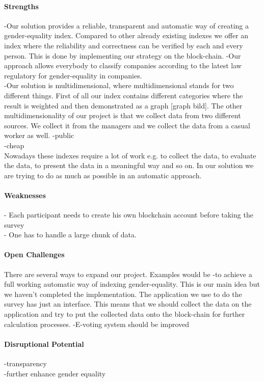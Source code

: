 \paragraph*{Strengths}
-Our solution provides a reliable, transparent and automatic way of creating a gender-equality index. Compared to other already existing indexes we offer an index where the reliability and correctness can be verified by each and every person. This is done by implementing our strategy on the block-chain. 
-Our approach allows everybody to classify companies according to the latest law regulatory for gender-equality in companies.\\
-Our solution is multidimensional, where multidimensional stands for two different things. First of all our index contains different categories where the result is weighted and then demonstrated as a graph [graph bild]. The other multidimensionality of our project is that we collect data from two different sources. We collect it from the managers and we collect the data from a casual worker as well.
-public\\
-cheap\\ Nowadays these indexes require a lot of work e.g. to collect the data, to evaluate the data, to present the data in a meaningful way and so on. In our solution we are trying to do as much as possible in an automatic approach.

\paragraph*{Weaknesses}
- Each participant needs to create his own blockchain account before taking the survey\\
- One has to handle a large chunk of data.

\paragraph*{Open Challenges}
There are several ways to expand our project. Examples would be
-to achieve a full working automatic way of indexing gender-equality. This is our main idea but we haven't completed the implementation. The application we use to do the survey has just an interface. This means that we should collect the data on the application and try to put the collected data onto the block-chain for further calculation processes. 
-E-voting system should be improved\\

	
\paragraph*{Disruptional Potential}
-transparency\\
-further enhance gender equality